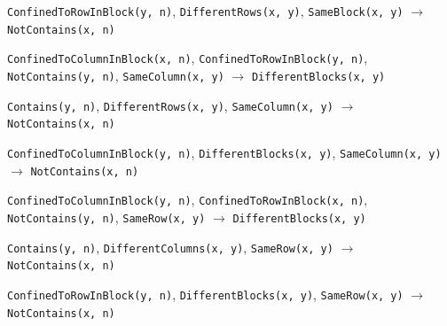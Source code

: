 \documentclass[11pt,a4paper]{article}
\theoremstyle{definition}
\theoremstyle{remark}
\begin{document}
{\begin{enumerate}[label={[\arabic*]},leftmargin=2.6em,itemsep=1pt]
  \item \texttt{ConfinedToRowInBlock(y,~n)}, \allowbreak \texttt{DifferentRows(x,~y)}, \allowbreak \texttt{SameBlock(x,~y)} \;$\to$\; \texttt{NotContains(x,~n)}
  \item \texttt{ConfinedToColumnInBlock(x,~n)}, \allowbreak \texttt{ConfinedToRowInBlock(y,~n)}, \allowbreak \texttt{NotContains(y,~n)}, \allowbreak \texttt{SameColumn(x,~y)} \;$\to$\; \texttt{DifferentBlocks(x,~y)}
  \item \texttt{Contains(y,~n)}, \allowbreak \texttt{DifferentRows(x,~y)}, \allowbreak \texttt{SameColumn(x,~y)} \;$\to$\; \texttt{NotContains(x,~n)}
  \item \texttt{ConfinedToColumnInBlock(y,~n)}, \allowbreak \texttt{DifferentBlocks(x,~y)}, \allowbreak \texttt{SameColumn(x,~y)} \;$\to$\; \texttt{NotContains(x,~n)}
  \item \texttt{ConfinedToColumnInBlock(y,~n)}, \allowbreak \texttt{ConfinedToRowInBlock(x,~n)}, \allowbreak \texttt{NotContains(y,~n)}, \allowbreak \texttt{SameRow(x,~y)} \;$\to$\; \texttt{DifferentBlocks(x,~y)}
  \item \texttt{Contains(y,~n)}, \allowbreak \texttt{DifferentColumns(x,~y)}, \allowbreak \texttt{SameRow(x,~y)} \;$\to$\; \texttt{NotContains(x,~n)}
  \item \texttt{ConfinedToRowInBlock(y,~n)}, \allowbreak \texttt{DifferentBlocks(x,~y)}, \allowbreak \texttt{SameRow(x,~y)} \;$\to$\; \texttt{NotContains(x,~n)}
\end{enumerate}}
\end{document}
